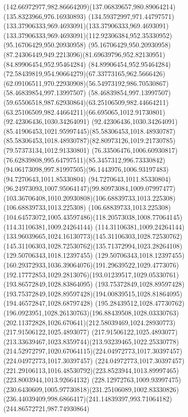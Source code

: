 {    \curveto(142.66972977,982.86664209)(137.06839657,980.89064214)(135.8323966,976.16930893)
    \curveto(134.59372997,971.44797571)(133.37906333,969.4693091)(133.37906333,969.4693091)
    \curveto(133.37906333,969.4693091)(112.92306384,952.35330952)(95.16706429,950.20930958)
    \curveto(95.16706429,950.20930958)(87.24306449,949.2213096)(81.69639796,952.82130951)
    \lineto(84.89906454,952.95464284)
    \curveto(84.89906454,952.95464284)(72.58439819,954.90664279)(67.33773165,962.5666426)
    \curveto(62.09106511,970.22930908)(56.54973192,986.70530867)(58.46839854,997.13997507)
    \curveto(58.46839854,997.13997507)(59.65506518,987.62930864)(63.25106509,982.44664211)
    \curveto(63.25106509,982.44664211)(66.695065,1012.91730801)(92.42306436,1030.34264091)
    \curveto(92.42306436,1030.34264091)(85.41906453,1021.95997445)(85.58306453,1018.48930787)
    \curveto(85.58306453,1018.48930787)(82.80973126,1019.21730785)(79.57373134,1012.91330801)
    \curveto(76.33506476,1006.60930817)(76.62839808,995.64797511)(85.3457312,996.73330842)
    \curveto(94.06173098,997.81997505)(96.1443976,1006.93197483)(94.7270643,1011.85330804)
    \curveto(94.7270643,1011.85330804)(96.24973093,1007.95064147)(99.80973084,1009.07997477)
    \curveto(103.36706408,1010.20930808)(106.68839733,1013.225308)(106.68839733,1013.225308)
    \curveto(106.68839733,1013.225308)(104.64573072,1005.43597486)(118.20573038,1008.77064145)
    \lineto(114.31106381,1009.24264144)
    \curveto(114.31106381,1009.24264144)(133.96039665,1024.16130773)(145.31106303,1028.72530762)
    \curveto(145.31106303,1028.72530762)(135.71372994,1023.28264108)(129.50706343,1018.12397455)
    \curveto(129.50706343,1018.12397455)(160.29372933,1036.39064076)(191.29639522,1029.4773076)
    \curveto(192.17772853,1029.2813076)(193.01239517,1029.05330761)(193.86572849,1028.83864095)
    \lineto(193.75372849,1028.89597428)
    \curveto(193.75372849,1028.89597428)(194.00839515,1028.81864095)(194.46572847,1028.68797428)
    \curveto(195.28439512,1028.47730762)(196.0923951,1028.26130763)(196.88439508,1028.03330763)
    \curveto(202.11372828,1026.670641)(212.58039469,1024.28930773)(217.91506122,1025.4893077)
    \curveto(217.91506122,1025.4893077)(213.33639467,1023.8359744)(213.93239465,1022.25330778)
    \curveto(214.52972797,1020.67064115)(224.04972773,1017.30397457)(224.04972773,1017.30397457)
    \curveto(224.04972773,1017.30397457)(221.29106113,1016.48530792)(223.8523944,1013.89997465)
    \lineto(223.8003944,1013.92664132)
    \curveto(228.12972763,1009.93997475)(230.6430609,1005.97730818)(231.25106089,1002.83330826)
    \curveto(236.44039409,998.6866417)(241.14839397,993.71064182)(244.86572721,987.74930864)
}
